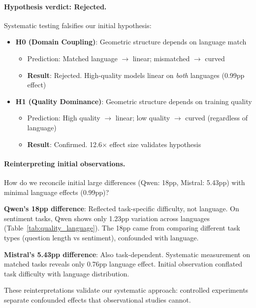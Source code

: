 \documentclass[11pt]{article}
\begin{document}
\paragraph{Hypothesis verdict: Rejected.}
Systematic testing falsifies our initial hypothesis:

\begin{itemize}
\item \textbf{H0 (Domain Coupling)}: Geometric structure depends on language match
\begin{itemize}
\item Prediction: Matched language $\to$ linear; mismatched $\to$ curved
\item \textbf{Result}: Rejected. High-quality models linear on \textit{both} languages (0.99pp effect)
\end{itemize}

\item \textbf{H1 (Quality Dominance)}: Geometric structure depends on training quality  
\begin{itemize}
\item Prediction: High quality $\to$ linear; low quality $\to$ curved (regardless of language)
\item \textbf{Result}: Confirmed. 12.6× effect size validates hypothesis
\end{itemize}
\end{itemize}

\paragraph{Reinterpreting initial observations.}
How do we reconcile initial large differences (Qwen: 18pp, Mistral: 5.43pp) with minimal language effects (0.99pp)?

\textbf{Qwen's 18pp difference}: Reflected task-specific difficulty, not language. On sentiment tasks, Qwen shows only 1.23pp variation across languages (Table~\ref{tab:quality_language}). The 18pp came from comparing different task types (question length vs sentiment), confounded with language.

\textbf{Mistral's 5.43pp difference}: Also task-dependent. Systematic measurement on matched tasks reveals only 0.76pp language effect. Initial observation conflated task difficulty with language distribution.

These reinterpretations validate our systematic approach: controlled experiments separate confounded effects that observational studies cannot.
\end{document}
